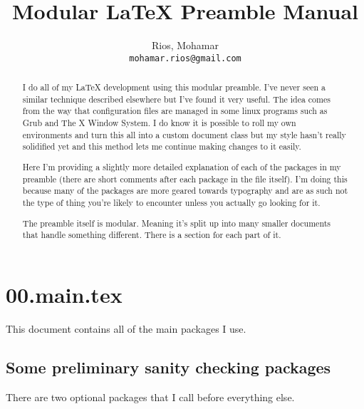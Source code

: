 \newcommand{\preamblefolder}{./include}       %

\usepackage[enable]{easy-todo}

\title{Modular \LaTeX{} Preamble Manual}
\author{
  Rios, Mohamar\\
  \texttt{mohamar.rios@gmail.com}
}


  \maketitle
  \tableofcontents
 
  \begin{abstract}
    I do all of my \LaTeX{} development using this modular preamble. I've never seen a similar technique described elsewhere but I've found it very useful. The idea comes from the way that configuration files are managed in some linux programs such as Grub and The X Window System. I do know it is possible to roll my own environments and turn this all into a custom document class but my style hasn't really solidified yet and this method lets me continue making changes to it easily.

    Here I'm providing a slightly more detailed explanation of each of the packages in my preamble (there are short comments after each package in the file itself). I'm doing this because many of the packages are more geared towards typography and are as such not the type of thing you're likely to encounter unless you actually go looking for it.

    The preamble itself is modular. Meaning it's split up into many smaller documents that handle something different. There is a section for each part of it.
  \end{abstract}
  
  \section{00.main.tex}\label{main}
    
    This document contains all of the main packages I use.

    \subsection{Some preliminary sanity checking packages}
      There are two optional packages that I call before everything else.

